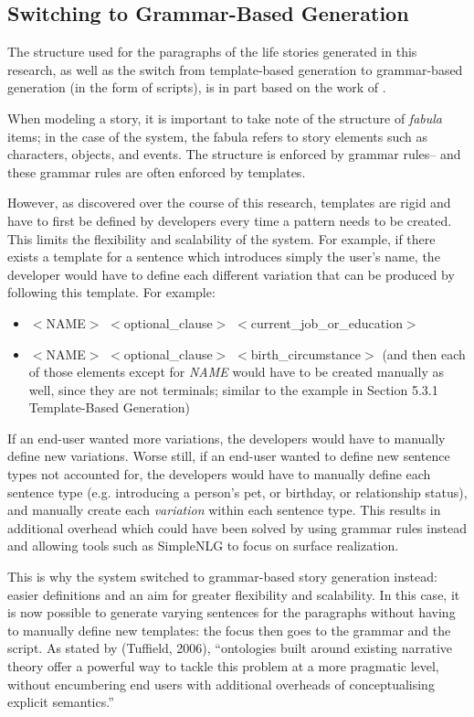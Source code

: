 \subsection{Switching to Grammar-Based Generation}
The structure used for the paragraphs of the life stories generated in this research, as well as the switch from template-based generation to grammar-based generation (in the form of scripts), is in part based on the work of \cite{Tuffield06ontologicalapproaches}.

When modeling a story, it is important to take note of the structure of \textit{fabula} items; in the case of the system, the fabula refers to story elements such as characters, objects, and events. The structure is enforced by grammar rules-- and these grammar rules are often enforced by templates.

However, as discovered over the course of this research, templates are rigid and have to first be defined by developers every time a pattern needs to be created. This limits the flexibility and scalability of the system. For example, if there exists a template for a sentence which introduces simply the user's name, the developer would have to define each different variation that can be produced by following this template. For example:

\begin{center}
\begin{itemize}
	\item $<$NAME$>$ $<$optional\_clause$>$ $<$current\_job\_or\_education$>$
	\item $<$NAME$>$ $<$optional\_clause$>$ $<$birth\_circumstance$>$
	(and then each of those elements except for \textit{NAME} would have to be created manually as well, since they are not terminals; similar to the example in Section 5.3.1 Template-Based Generation)
\end{itemize}
\end{center}

If an end-user wanted more variations, the developers would have to manually define new variations. Worse still, if an end-user wanted to define new sentence types not accounted for, the developers would have to manually define each sentence type (e.g. introducing a person's pet, or birthday, or relationship status), and manually create each \textit{variation} within each sentence type. This results in additional overhead which could have been solved by using grammar rules instead and allowing tools such as SimpleNLG to focus on surface realization.

This is why the system switched to grammar-based story generation instead: easier definitions and an aim for greater flexibility and scalability. In this case, it is now possible to generate varying sentences for the paragraphs without having to manually define new templates: the focus then goes to the grammar and the script. As stated by (Tuffield, 2006), ``ontologies built around existing narrative theory offer a powerful way to tackle this problem at a more pragmatic level, without encumbering end users with additional overheads of conceptualising explicit semantics.''

